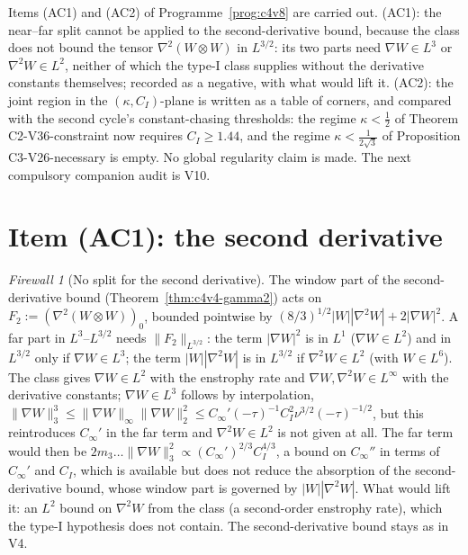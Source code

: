 \documentclass[11pt]{article}
\theoremstyle{plain}
\theoremstyle{definition}
\theoremstyle{remark}
\newtheorem{firewall}[theorem]{Firewall}
\begin{document}
Items (AC1) and (AC2) of Programme~\ref{prog:c4v8} are carried out.
(AC1): the near--far split cannot be applied to the second-derivative
bound, because the class does not bound the tensor \(\nabla^2(W\otimes W)\) in
\(L^{3/2}\): its two parts need \(\nabla W\in L^3\) or \(\nabla^2W\in L^2\), neither of which
the type-I class supplies without the derivative constants
themselves; recorded as a negative, with what would lift it.  (AC2):
the joint region in the \((\kappa,C_I)\)-plane is written as a table of
corners, and compared with the second cycle's constant-chasing
thresholds: the regime \(\kappa<\frac12\) of Theorem C2-V36-constraint now
requires \(C_I\ge1.44\), and the regime \(\kappa<\frac1{2\sqrt3}\) of Proposition
C3-V26-necessary is empty.  No global regularity claim is made.  The
next compulsory companion audit is V10.

\section{Item (AC1): the second derivative}
\label{sec:c4v8-second}

\begin{firewall}[No split for the second derivative]
\label{fw:c4v8-no-split}
The window part of the second-derivative bound
(Theorem~\ref{thm:c4v4-gamma2}) acts on \(F_2:=(\nabla^2(W\otimes W))_0\), bounded
pointwise by \((8/3)^{1/2}|W||\nabla^2W|+2|\nabla W|^2\).  A far part in
\(L^3\)--\(L^{3/2}\) needs \(\|F_2\|_{L^{3/2}}\): the term \(|\nabla W|^2\) is in \(L^1\) (\(\nabla W\in L^2\)) and in
\(L^{3/2}\) only if \(\nabla W\in L^3\); the term \(|W||\nabla^2W|\) is in \(L^{3/2}\) if \(\nabla^2W\in L^2\)
(with \(W\in L^6\)).  The class gives \(\nabla W\in L^2\) with the enstrophy rate and
\(\nabla W,\nabla^2W\in L^\infty\) with the derivative constants; \(\nabla W\in L^3\) follows by
interpolation, \(\|\nabla W\|_3^3\le\|\nabla W\|_\infty\|\nabla W\|_2^2\le C_\infty'(-\tau)^{-1}C_I^2\nu^{3/2}(-\tau)^{-1/2}\), but this
reintroduces \(C_\infty'\) in the far term and \(\nabla^2W\in L^2\) is not given at all.
The far term would then be \(2m_3\dots\|\nabla W\|_3^2\propto(C_\infty')^{2/3}C_I^{4/3}\), a bound
on \(C_\infty''\) in terms of \(C_\infty'\) and \(C_I\), which is available but does not
reduce the absorption of the second-derivative bound, whose window
part is governed by \(|W||\nabla^2W|\).  What would lift it: an \(L^2\) bound on
\(\nabla^2W\) from the class (a second-order enstrophy rate), which the type-I
hypothesis does not contain.  The second-derivative bound stays as
in V4.
\end{firewall}
\end{document}
